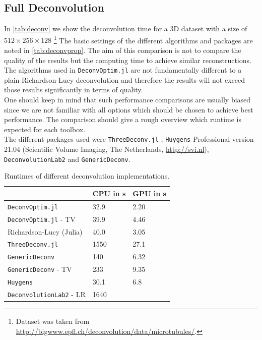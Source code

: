 \documentclass{juliacon}
\begin{document}
    \subsection{Full Deconvolution}
        In \autoref{tab:deconv} we show the deconvolution time for a 3D dataset with a size of $512 \times 256 \times 128$ 
        \footnote{Dataset was taken from \url{http://bigwww.epfl.ch/deconvolution/data/microtubules/}\cite{deconvlab2}.} 
        The basic settings of the different algorithms and packages are noted in \autoref{tab:deconvprop}.
        The aim of this comparison is not to compare the quality of the results but the computing time to achieve similar reconstructions. 
        The algorithms used in \verb|DeconvOptim.jl| are not fundamentally different to a plain Richardson-Lucy deconvolution and therefore the results will 
        not exceed those results significantly in terms of quality.\\
        One should keep in mind that such performance comparisons are usually biased since we are not
        familiar with all options which should be chosen to achieve best performance.
        The comparison should give a rough overview which runtime is expected for each toolbox.\\
        The different packages used were \verb|ThreeDeconv.jl| \cite{ikoma2018convex}, \verb|Huygens| Professional version 21.04 (Scientific Volume Imaging, The Netherlands, \url{http://svi.nl}), \verb|DeconvolutionLab2| \cite{deconvlab2} and \verb|GenericDeconv|.  

        \begin{table}[h]
            \begin{tabular}{l l l}
                &  CPU in s& GPU in s\\ 
            \hline
            \verb|DeconvOptim.jl| & 32.9 & 2.20\\
            \verb|DeconvOptim.jl| - TV & 39.9 & 4.46 \\
            Richardson-Lucy (Julia) & 40.0 & 3.05 \\
            \verb|ThreeDeconv.jl|& 1550 & 27.1 \\
            \verb|GenericDeconv|  & 140 & 6.32\\
            \verb|GenericDeconv| - TV & 233 & 9.35 \\
            \verb|Huygens| & 30.1 & 6.8 \\
            \verb|DeconvolutionLab2| - LR& 1640 & \\
            \end{tabular}
            \caption{Runtimes of different deconvolution implementations.}
            \label{tab:deconv}
        \end{table}
\end{document}
